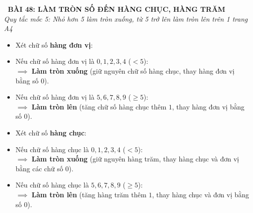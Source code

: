 \documentclass[11pt,a4paper]{article}
\begin{document}
\begin{tcolorbox}[
  enhanced,
  colback=white,
  colframe=primary,
  arc=3mm,
  boxrule=1.2pt,
  left=4mm, right=4mm, top=2.5mm, bottom=2.5mm,
  drop shadow=black!10!white
]
  \centering
  {\Large\bfseries\color{primary}\faBookmark\ BÀI 48: LÀM TRÒN SỐ ĐẾN HÀNG CHỤC, HÀNG TRĂM}\\[1.5mm]
  {\small\itshape\color{black!75}Quy tắc mốc 5: Nhỏ hơn 5 làm tròn xuống, từ 5 trở lên làm tròn lên trên 1 trang A4}
\end{tcolorbox}

\vspace{-2mm}


\noindent
\begin{minipage}[t]{0.49\textwidth}\vspace{0pt}
\begin{tcolorbox}[
  enhanced,
  colback=blue!4!white,
  colframe=blue!75!black,
  arc=2mm, boxrule=0.8pt,
  left=2mm, right=2mm, top=1.8mm, bottom=1.8mm,
  title={\footnotesize\bfseries\color{white}\faKey\ 1. Làm tròn số đến hàng chục}
]
{\footnotesize
\begin{itemize}\setlength{\itemsep}{1.5pt}\setlength{\leftskip}{-2.5mm}
  \item Xét chữ số \textbf{hàng đơn vị}:
  \item Nếu chữ số hàng đơn vị là $0, 1, 2, 3, 4$ ($< 5$):\\
  $\implies$ \textbf{Làm tròn xuống} (giữ nguyên chữ số hàng chục, thay hàng đơn vị bằng số $0$).
  \item Nếu chữ số hàng đơn vị là $5, 6, 7, 8, 9$ ($\ge 5$):\\
  $\implies$ \textbf{Làm tròn lên} (tăng chữ số hàng chục thêm $1$, thay hàng đơn vị bằng số $0$).
\end{itemize}
}
\end{tcolorbox}
\end{minipage}
\hfill
\begin{minipage}[t]{0.49\textwidth}\vspace{0pt}
\begin{tcolorbox}[
  enhanced,
  colback=teal!4!white,
  colframe=teal!75!black,
  arc=2mm, boxrule=0.8pt,
  left=2mm, right=2mm, top=1.8mm, bottom=1.8mm,
  title={\footnotesize\bfseries\color{white}\faSliders\ 2. Làm tròn số đến hàng trăm}
]
{\footnotesize
\begin{itemize}\setlength{\itemsep}{1.5pt}\setlength{\leftskip}{-2.5mm}
  \item Xét chữ số \textbf{hàng chục}:
  \item Nếu chữ số hàng chục là $0, 1, 2, 3, 4$ ($< 5$):\\
  $\implies$ \textbf{Làm tròn xuống} (giữ nguyên hàng trăm, thay hàng chục và đơn vị bằng các chữ số $0$).
  \item Nếu chữ số hàng chục là $5, 6, 7, 8, 9$ ($\ge 5$):\\
  $\implies$ \textbf{Làm tròn lên} (tăng hàng trăm thêm $1$, thay hàng chục và đơn vị bằng số $0$).
\end{itemize}
}
\end{tcolorbox}
\end{minipage}
\end{document}

